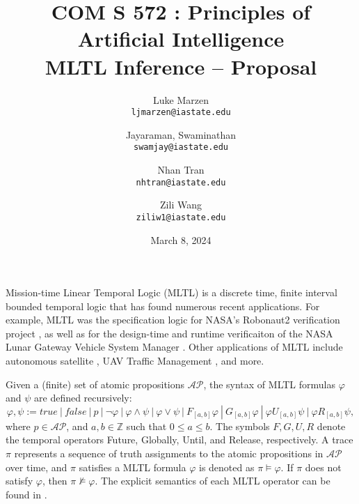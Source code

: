 \documentclass[12pt]{article}
\renewcommand{\phi}{\varphi}
\begin{document}
\title{\bf
\large COM S 572 : Principles of Artificial Intelligence \\
\large MLTL Inference -- Proposal}

\author{
  Luke Marzen\\
  \texttt{ljmarzen@iastate.edu}
  \and
  Jayaraman, Swaminathan\\
  \texttt{swamjay@iastate.edu}
  \and
  Nhan Tran\\
  \texttt{nhtran@iastate.edu}
  \and
  Zili Wang\\
  \texttt{ziliw1@iastate.edu}
}

\date{March 8, 2024}

\maketitle


Mission-time Linear Temporal Logic (MLTL) is a discrete time, finite interval bounded temporal logic that has found numerous recent applications. 
For example, MLTL was the specification logic for NASA's Robonaut2 verification project \cite{KZJZR20}, as well as for the design-time and runtime verificaiton of the NASA Lunar Gateway Vehicle System Manager \cite{DBR21}.
Other applications of MLTL include autonomous satellite \cite{JAXA}, UAV Traffic Management \cite{HCHJR21}, and more. 

Given a (finite) set of atomic propositions $\mathcal{AP}$, the syntax of MLTL formulas $\phi$ and $\psi$ are defined recursively: 
$$ \phi, \psi := true \ | \ false \ | \ p \ | \ \neg \phi \ | \ \phi \land \psi \ | \ \phi \lor \psi \ | \ F_{[a,b]} \phi \ | \ G_{[a,b]} \phi \ | \ \phi U_{[a,b]} \psi \ | \ \phi R_{[a,b]} \psi, $$
where $p \in \mathcal{AP}$, and $a, b \in \mathbb{Z}$ such that $0 \leq a \leq b$. 
The symbols $F, G, U, R$ denote the temporal operators Future, Globally, Until, and Release, respectively.
A trace $\pi$ represents a sequence of truth assignments to the atomic propositions in $\mathcal{AP}$ over time, and $\pi$ satisfies a MLTL formula $\phi$ is denoted as $\pi \models \phi$.
If $\pi$ does not satisfy $\phi$, then $\pi \not\models \phi$.
The explicit semantics of each MLTL operator can be found in \cite{WEST-iFM23}.
\end{document}
